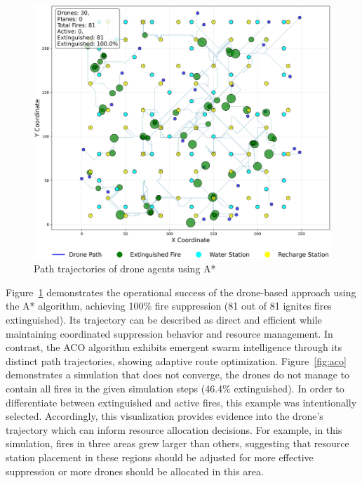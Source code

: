 \documentclass[11pt, a4paper]{article}
\begin{document}
\begin{figure}[htbp]
    \centering
    \includegraphics[width=1\linewidth]{figures/A*_agent_paths.jpeg}
    \caption{Path trajectories of drone agents using A*}
    \label{fig:a_star}
\end{figure}

Figure~\ref{fig:a_star} demonstrates the operational success of the drone-based approach using the A* algorithm, achieving 100\% fire suppression (81 out of 81 ignites fires extinguished). Its trajectory can be described as direct and efficient while maintaining coordinated suppression behavior and resource management. In contrast, the ACO algorithm exhibits emergent swarm intelligence through its distinct path trajectories, showing adaptive route optimization. Figure~\ref{fig:aco} demonstrates a simulation that does not converge, the drones do not manage to contain all fires in the given simulation steps (46.4\% extinguished). In order to differentiate between extinguished and active fires, this example was intentionally selected. Accordingly, this visualization provides evidence into the drone's trajectory which can inform resource allocation decisions. For example, in this simulation, fires in three areas grew larger than others, suggesting that resource station placement in these regions should be adjusted for more effective suppression or more drones should be allocated in this area. 
\end{document}
